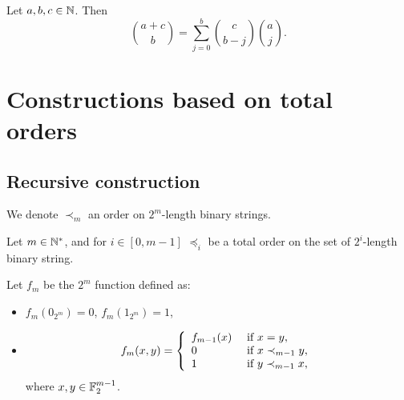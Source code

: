 \documentclass[11pt]{llncs}
\begin{document}
\begin{Prop}\label{prop:Vandermonde}
	Let $a,b,c \in \mathbb{N}$. Then
	\begin{equation*}
	\binom{a+c}{b}=\sum_{j=0}^b\binom{c}{b-j}  \binom{a}{j}.
	\end{equation*}
\end{Prop}






















\section{Constructions based on total orders}

\subsection{Recursive construction}

We denote $\prec_m$ an order on $2^m$-length binary strings.

\begin{definition}\label{def:orderWPB}
	Let $m\in \mathbb{N}^*$, and for $i \in [0,m-1]$ $\preceq_i$ be a total order on the set of $2^i$-length binary string.
	
	Let $f_m$ be the $2^m$ function defined as:
	\begin{itemize}
		\item $f_m(0_{2^m})=0$, $f_m(1_{2^m})=1$,
		\item 	\[f_m(x,y)= \left \{
		\begin{array}{l l}
		f_{m-1}(x) & \text{ if }  x= y, \\
		0   & \text{ if }  x \prec_{m-1} y,\\
		1   & \text{ if }  y \prec_{m-1} x,
		\end{array}
		\right. \]
		where $x,y\in \mathbb{F}_2^{m-1}$.
	\end{itemize}
	
\end{definition}
\end{document}
